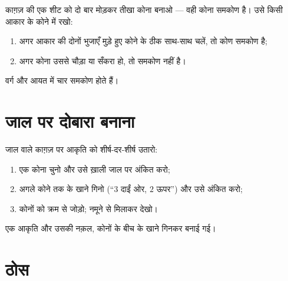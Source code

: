 \begin{method}[समकोण की जाँच]\label{met:g2:shapes:rightangle}
काग़ज़ की एक शीट को दो बार मोड़कर तीखा कोना बनाओ --- वही कोना
समकोण है। उसे किसी आकार के कोने में रखो:
\begin{enumerate}
  \item अगर आकार की दोनों भुजाएँ मुड़े हुए कोने के ठीक साथ-साथ
        चलें, तो कोण समकोण है;
  \item अगर कोना उससे चौड़ा या सँकरा हो, तो समकोण नहीं है।
\end{enumerate}
वर्ग और आयत में चार समकोण होते हैं।
\end{method}

\section{जाल पर दोबारा बनाना}

\begin{method}[आकृति की नक़ल]\label{met:g2:shapes:copy}
जाल वाले काग़ज़ पर आकृति को शीर्ष-दर-शीर्ष उतारो:
\begin{enumerate}
  \item एक कोना चुनो और उसे ख़ाली जाल पर अंकित करो;
  \item अगले कोने तक के खाने गिनो (``$3$ दाईं ओर, $2$
        ऊपर'') और उसे अंकित करो;
  \item कोनों को क्रम से जोड़ो; नमूने से मिलाकर देखो।
\end{enumerate}
\end{method}

\begin{omfigure}

{\small एक आकृति और उसकी नक़ल, कोनों के बीच के खाने गिनकर
बनाई गई।}
\end{omfigure}

\section{ठोस}

